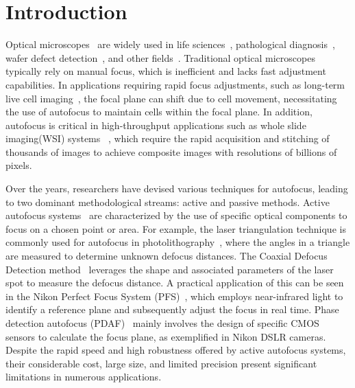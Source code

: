 \section{Introduction}

Optical microscopes~\cite{balasubramanian2023imagining,davidson2002optical,ma2021comprehensive} are widely used in life sciences~\cite{sijtsema1998confocal,del2022field,ghosh2023viewing}, pathological diagnosis~\cite{chen2011optical,pallen2021advances}, wafer defect detection~\cite{ma2023review}, and other fields~\cite{chen2020microsphere}. 
Traditional optical microscopes typically rely on manual focus, which is inefficient and lacks fast adjustment capabilities. 
In applications requiring rapid focus adjustments, such as long-term live cell imaging~\cite{balasubramanian2023imagining}, the focal plane can shift due to cell movement, necessitating the use of autofocus to maintain cells within the focal plane.
In addition, autofocus is critical in high-throughput applications such as whole slide imaging(WSI) systems ~\cite{li2022comprehensive,zhang2019whole,guo2019openwsi}, which require the rapid acquisition and stitching of thousands of images to achieve composite images with resolutions of billions of pixels.

Over the years, researchers have devised various techniques for autofocus, leading to two dominant methodological streams: active and passive methods.
Active autofocus systems~\cite{zhang2019novel,bian2020autofocusing,han2023novel,jiang2024large,instruments2012perfect,chan2018improving} are characterized by the use of specific optical components to focus on a chosen point or area.
For example, the laser triangulation technique is commonly used for autofocus in photolithography~\cite{zhang2019novel,bian2020autofocusing}, where the angles in a triangle are measured to determine unknown defocus distances.
The Coaxial Defocus Detection method~\cite{han2023novel,jiang2024large} leverages the shape and associated parameters of the laser spot to measure the defocus distance. 
A practical application of this can be seen in the Nikon Perfect Focus System (PFS)~\cite{instruments2012perfect}, which employs near-infrared light to identify a reference plane and subsequently adjust the focus in real time.
Phase detection autofocus (PDAF)~\cite{chan2018improving} mainly involves the design of specific CMOS sensors to calculate the focus plane, as exemplified in Nikon DSLR cameras.
Despite the rapid speed and high robustness offered by active autofocus systems, their considerable cost, large size, and limited precision present significant limitations in numerous applications.

